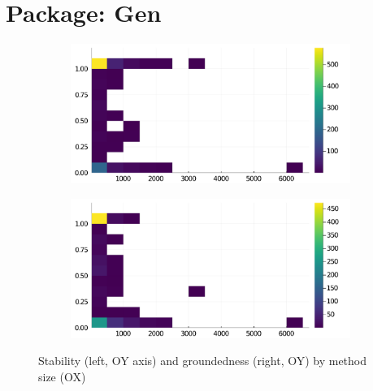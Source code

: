 \section*{Package: Gen}
\begin{figure}[h]
     \begin{subfigure}[b]{0.49\textwidth}
       \includegraphics[width=\textwidth]{figs/all-package-graphs/Gen-size-vs-stable.pdf}
     \end{subfigure}
     \begin{subfigure}[b]{0.49\textwidth}
       \includegraphics[width=\textwidth]{figs/all-package-graphs/Gen-size-vs-grounded.pdf}
     \end{subfigure}
\caption{Stability (left, OY axis) and groundedness (right, OY) by method size (OX)}%
%
\label{figs:size:Gen}
\end{figure}

